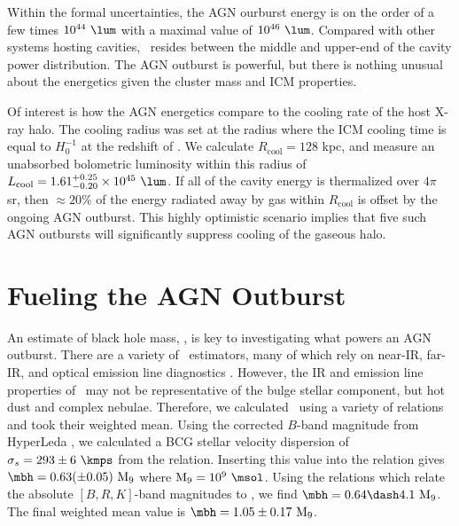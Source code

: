 \documentclass[useAMS,usenatbib]{mn2e}
\begin{document}
Within the formal uncertainties, the AGN ourburst energy is on the
order of a few times $10^{44} ~\lum$ with a maximal value of $10^{46}
~\lum$. Compared with other systems hosting cavities, \irs\ resides
between the middle and upper-end of the cavity power distribution. The
AGN outburst is powerful, but there is nothing unusual about the
energetics given the cluster mass and ICM properties.

Of interest is how the AGN energetics compare to the cooling rate of
the host X-ray halo. The cooling radius was set at the radius where
the ICM cooling time is equal to $H_0^{-1}$ at the redshift of
\irs. We calculate $R_{\mathrm{cool}} = 128$ kpc, and measure an
unabsorbed bolometric luminosity within this radius of
$L_{\mathrm{cool}} = 1.61^{+0.25}_{-0.20} \times 10^{45} ~\lum$. If
all of the cavity energy is thermalized over $4\pi$ sr, then $\approx
20\%$ of the energy radiated away by gas within $R_{\mathrm{cool}}$ is
offset by the ongoing AGN outburst. This highly optimistic scenario
implies that five such AGN outbursts will significantly suppress
cooling of the gaseous halo.

\section{Fueling the AGN Outburst}
\label{sec:fuel}

An estimate of black hole mass, \mbh, is key to investigating what
powers an AGN outburst. There are a variety of \mbh\ estimators, many
of which rely on near-IR, far-IR, and optical emission line
diagnostics \citep{marconihunt03, 2007MNRAS.379..711G,
  2008ApJ...673..703M}. However, the IR and emission line properties
of \irs\ may not be representative of the bulge stellar component, but
hot dust and complex nebulae. Therefore, we calculated \mbh\ using a
variety of relations and took their weighted mean. Using the corrected
$B$-band magnitude from HyperLeda \citep{hyperleda}, we calculated a
BCG stellar velocity dispersion of $\sigma_s = 293 \pm 6 ~\kmps$ from
the \citet{1976ApJ...204..668F} relation. Inserting this value into
the \citet{2002ApJ...574..740T} relation gives $\mbh = 0.63 (\pm 0.05)
~\mnine$ where $\mnine = 10^9 ~\msol$. Using the
\citet{2007MNRAS.379..711G} relations which relate the absolute
$[B,R,K]$-band magnitudes to \mbh, we find $\mbh = 0.64 \dash 4.1
~\mnine$. The final weighted mean value is $\mbh = 1.05 \pm 0.17
~\mnine$.
\end{document}
